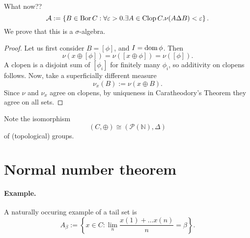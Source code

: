 What now??
\[ 
    \mathcal{A} := \left\{ B \in \operatorname{Bor} C : \forall\varepsilon > 0. \exists A \in \operatorname{Clop} C. \nu (A \Delta B) <\varepsilon \right\}.
\]
We prove that this is a \( \sigma \)-algebra.

\begin{proof}
    Let us first consider \( B = \left [ \phi \right ] \), and \( I = \operatorname{dom} \phi \). Then
    \[ 
       \nu \left( x \oplus \left[ \phi \right] \right) = \nu \left( \left[ x \oplus \phi \right] \right) = \nu \left( \left[ \phi \right] \right).
   \]
   A clopen is a disjoint sum of \( \left[ \phi_i \right] \) for finitely many \( \phi_i \), so additivity on clopens follows. Now, take a superficially different measure
   \[ 
      \nu_x(B) := \nu \left( x \oplus B \right). 
  \]
  Since \( \nu \) and \( \nu_x \) agree on clopens, by uniqueness in Caratheodory's Theorem they agree on all sets.
\end{proof}

Note the isomorphism
\[ 
    (C, \oplus) \cong ( \mathcal{P}( \mathbb{N} ), \Delta ) 
\]
of (topological) groups.

\section{Normal number theorem}


\paragraph{Example.} A naturally occuring example of a tail set is
\[ 
    A_\beta := \left\{ x \in C : \lim_n \frac{x(1) + \ldots x(n)}{n}= \beta \right\}.
\]


